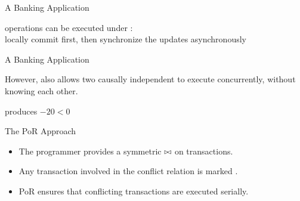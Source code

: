 \begin{frame}{\cc}
\end{frame}


\begin{frame}{A Banking Application}
  \begin{center}

    \pause
    \vspace{0.50cm}
     operations can be executed under \causalcolor{\cc}: \\[3pt]
    locally commit first, then synchronize the updates asynchronously

    \pause
    \vspace{0.30cm}
    {}
  \end{center}
\end{frame}

\begin{frame}{A Banking Application}
  \begin{center}

    \pause
    \vspace{0.50cm}
    {However, \cc{} also allows two causally independent  to execute concurrently,
      without knowing each other.}

    \pause
    \vspace{0.30cm}
    {} produces $-20 < 0$
  \end{center}
\end{frame}

\begin{frame}{The PoR Approach}
  \begin{itemize}[<+->]
    \setlength{\itemsep}{8pt}
    \item The programmer provides a symmetric  $\bowtie$
          on transactions.
    \item Any transaction involved in the conflict relation is marked
          .
    \item PoR ensures that conflicting transactions are executed serially.
  \end{itemize}
\end{frame}

